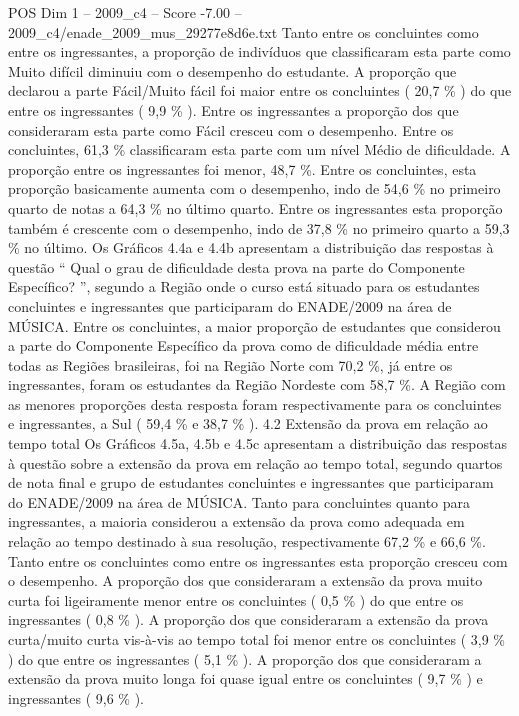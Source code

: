 \begin{textsample}{POS Dim 1 – 2009\_c4 – Score -7.00 – 2009\_c4/enade\_2009\_mus\_29277e8d6e.txt}
Tanto entre os concluintes como entre os ingressantes, a proporção de indivíduos que classificaram esta parte como Muito difícil diminuiu com o desempenho do estudante.
A proporção que declarou a parte Fácil/Muito fácil foi maior entre os concluintes ( 20,7 \% ) do que entre os ingressantes ( 9,9 \% ).
Entre os ingressantes a proporção dos que consideraram esta parte como Fácil cresceu com o desempenho.
Entre os concluintes, 61,3 \% classificaram esta parte com um nível Médio de dificuldade.
A proporção entre os ingressantes foi menor, 48,7 \%.
Entre os concluintes, esta proporção basicamente aumenta com o desempenho, indo de 54,6 \% no primeiro quarto de notas a 64,3 \% no último quarto.
Entre os ingressantes esta proporção também é crescente com o desempenho, indo de 37,8 \% no primeiro quarto a 59,3 \% no último.
Os Gráficos 4.4a e 4.4b apresentam a distribuição das respostas à questão “ Qual o grau de dificuldade desta prova na parte do Componente Específico? ”, segundo a Região onde o curso está situado para os estudantes concluintes e ingressantes que participaram do ENADE/2009 na área de MÚSICA.
Entre os concluintes, a maior proporção de estudantes que considerou a parte do Componente Específico da prova como de dificuldade média entre todas as Regiões brasileiras, foi na Região Norte com 70,2 \%, já entre os ingressantes, foram os estudantes da Região Nordeste com 58,7 \%.
A Região com as menores proporções desta resposta foram respectivamente para os concluintes e ingressantes, a Sul ( 59,4 \% e 38,7 \% ). 4.2 Extensão da prova em relação ao tempo total Os Gráficos 4.5a, 4.5b e 4.5c apresentam a distribuição das respostas à questão sobre a extensão da prova em relação ao tempo total, segundo quartos de nota final e grupo de estudantes concluintes e ingressantes que participaram do ENADE/2009 na área de MÚSICA.
Tanto para concluintes quanto para ingressantes, a maioria considerou a extensão da prova como adequada em relação ao tempo destinado à sua resolução, respectivamente 67,2 \% e 66,6 \%.
Tanto entre os concluintes como entre os ingressantes esta proporção cresceu com o desempenho.
A proporção dos que consideraram a extensão da prova muito curta foi ligeiramente menor entre os concluintes ( 0,5 \% ) do que entre os ingressantes ( 0,8 \% ).
A proporção dos que consideraram a extensão da prova curta/muito curta vis-à-vis ao tempo total foi menor entre os concluintes ( 3,9 \% ) do que entre os ingressantes ( 5,1 \% ).
A proporção dos que consideraram a extensão da prova muito longa foi quase igual entre os concluintes ( 9,7 \% ) e ingressantes ( 9,6 \% ).

\end{textsample}
